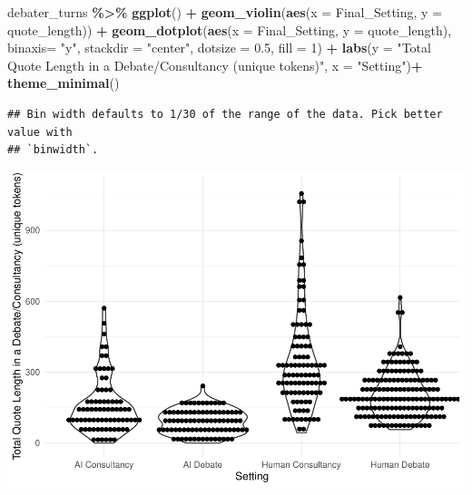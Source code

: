 \documentclass[
]{article}
\newenvironment{Shaded}{\begin{snugshade}}{\end{snugshade}}
\newcommand{\AttributeTok}[1]{\textcolor[rgb]{0.13,0.29,0.53}{#1}}
\newcommand{\DecValTok}[1]{\textcolor[rgb]{0.00,0.00,0.81}{#1}}
\newcommand{\FloatTok}[1]{\textcolor[rgb]{0.00,0.00,0.81}{#1}}
\newcommand{\FunctionTok}[1]{\textcolor[rgb]{0.13,0.29,0.53}{\textbf{#1}}}
\newcommand{\NormalTok}[1]{#1}
\newcommand{\SpecialCharTok}[1]{\textcolor[rgb]{0.81,0.36,0.00}{\textbf{#1}}}
\newcommand{\StringTok}[1]{\textcolor[rgb]{0.31,0.60,0.02}{#1}}
\begin{document}
\begin{Shaded}
\begin{Highlighting}[]
\NormalTok{debater\_turns }\SpecialCharTok{\%\textgreater{}\%}
  \FunctionTok{ggplot}\NormalTok{() }\SpecialCharTok{+}
  \FunctionTok{geom\_violin}\NormalTok{(}\FunctionTok{aes}\NormalTok{(}\AttributeTok{x =}\NormalTok{ Final\_Setting, }\AttributeTok{y =}\NormalTok{ quote\_length)) }\SpecialCharTok{+}
  \FunctionTok{geom\_dotplot}\NormalTok{(}\FunctionTok{aes}\NormalTok{(}\AttributeTok{x =}\NormalTok{ Final\_Setting, }\AttributeTok{y =}\NormalTok{ quote\_length), }\AttributeTok{binaxis=} \StringTok{"y"}\NormalTok{,}
               \AttributeTok{stackdir =} \StringTok{"center"}\NormalTok{,}
               \AttributeTok{dotsize =} \FloatTok{0.5}\NormalTok{,}
               \AttributeTok{fill =} \DecValTok{1}\NormalTok{) }\SpecialCharTok{+}
  \FunctionTok{labs}\NormalTok{(}\AttributeTok{y =} \StringTok{"Total Quote Length in a Debate/Consultancy (unique tokens)"}\NormalTok{, }\AttributeTok{x =} \StringTok{"Setting"}\NormalTok{)}\SpecialCharTok{+}
  \FunctionTok{theme\_minimal}\NormalTok{()}
\end{Highlighting}
\end{Shaded}

\begin{verbatim}
## Bin width defaults to 1/30 of the range of the data. Pick better value with
## `binwidth`.
\end{verbatim}

\includegraphics[width=1\linewidth]{debate-2309_files/figure-latex/quote_length graph-5}
\end{document}
